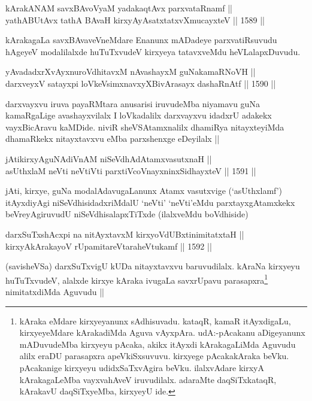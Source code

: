 \begin{shl}
kArakANAM savxBAvoV\s yaM yadakaqtAvx parxvataRnamf || \\
yathA\s BUtAvx tathA BAvaH kirxyAyAsatxtatxvXmucayxteV ||  1589 ||  
\end{shl}

\begin{artha}
kArakagaLa savxBAvaveVneMdare Enanunx mADadeye parxvatiRsuvudu hAgeyeV modalilalxde huTuTxvudeV kirxyeya tatavxveMdu heVLalapxDuvudu.
\end{artha}

\begin{shl}
yAvadadxrXvAyxnuroVdhitavxM nAvashayxM guNakamaRNoVH || \\
darxveyxV satayxpi loVkeV\s simxnavxyXBivArasayx dashaRnAtf ||  1590 ||  
\end{shl}

\begin{artha}
darxvayxvu iruva payaRMtara anusarisi iruvudeMba niyamavu guNa kamaRgaLige avashayxvilalx I loVkadalilx darxvayxvu idadxrU adakekx vayxBicAravu kaMDide. niviR sheVSAtamxnalilx dhamiRya nitayxteyiMda dhamaRkekx nitayxtavxvu eMba parxshenxge eDeyilalx ||
\end{artha}

\begin{shl}
jAtikirxyAguNAdiVnAM niSeVdhAdAtamxvasutxnaH || \\
asUthxlaM neVti neVtiVti parxtiVcoV\s nayxninxSidhayxteV ||  1591 || 
\end{shl}

\begin{artha}
jAti, kirxye, guNa modalAdavugaLanunx Atamx vasutxvige (`asUthxlamf') itAyxdiyAgi niSeVdhisidadxriMdalU `neVti' `neVti'eMdu parxtayxgAtamxkekx beVreyAgiruvudU niSeVdhisalapxTiTxde (ilalxveMdu boVdhiside) 
\end{artha}


\begin{shl}
darxSuTxshAcxpi na nitAyxtavxM kirxyoVdUBxtinimitatxtaH || \\
kirxyAkArakayoV rUpamitareVtaraheVtukamf ||  1592 ||  
\end{shl}

\begin{artha}
(savisheVSa) darxSuTxvigU kUDa nitayxtavxvu baruvudilalx. kAraNa kirxyeyu huTuTxvudeV, alalxde kirxye kAraka ivugaLa savxrUpavu parasapxra\footnote{kAraka eMdare kirxyeyanunx sAdhisuvadu. kataqR, kamaR itAyxdigaLu, kirxyeyeMdare kArakadiMda Aguva vAyxpAra. udA:-pAcakanu aDigeyanunx mADuvudeMba kirxyeyu pAcaka, akikx itAyxdi kArakagaLiMda Aguvudu alilx eraDU parasapxra apeVkiSxsuvuvu. kirxyege pAcakakAraka beVku. pAcakanige kirxyeyu udidxSaTxvAgira beVku. ilalxvAdare kirxyA kArakagaLeMba vayxvahAveV iruvudilalx. adaraMte daqSiTxkataqR, kArakavU daqSiTxyeMba, kirxyeyU ide.} nimitatxdiMda Aguvudu ||
\end{artha}

